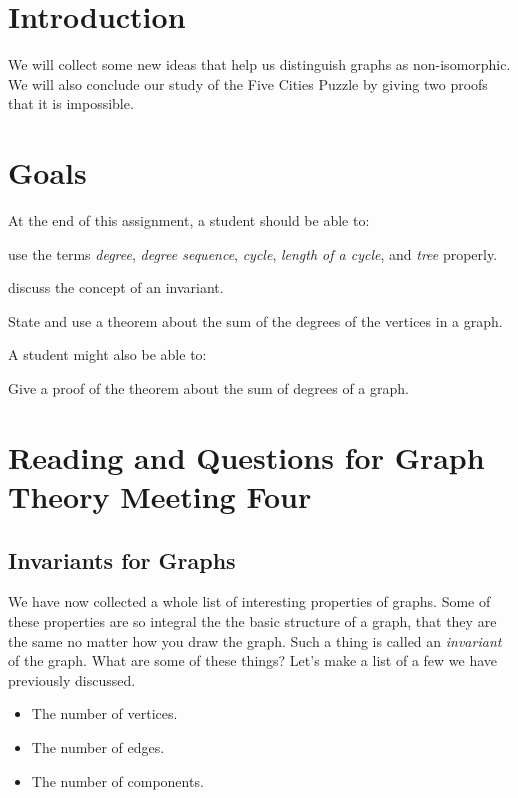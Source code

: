 \documentclass[12pt,letterpaper]{article}
\theoremstyle{definition}
\begin{document}
\setlength{\parskip}{1ex plus 0.5ex minus 0.2ex}
\setlength{\parindent}{0pt}

\pagestyle{fancy}
\cfoot{}

\section*{Introduction}

We will collect some new ideas that help us distinguish graphs as non-isomorphic. We will also conclude our
study of the Five Cities Puzzle by giving two proofs that it is impossible.

\section*{Goals}
At the end of this assignment, a student should be able to:
\begin{compactitem}
\item use the terms \emph{degree}, \emph{degree sequence}, \emph{cycle}, \emph{length of a cycle}, and \emph{tree} properly.
\item discuss the concept of an invariant.
\item State and use a theorem about the sum of the degrees of the vertices in a graph.
\end{compactitem}
A student might also be able to:
\begin{compactitem}
\item Give a proof of the theorem about the sum of degrees of a graph.
\end{compactitem}

\section*{Reading and Questions for Graph Theory Meeting Four}

\subsection*{Invariants for Graphs}

We have now collected a whole list of interesting properties of graphs. Some of these properties are so integral
the the basic structure of a graph, that they are the same no matter how you draw the graph. Such a thing is
called an \emph{invariant} of the graph. What are some of these things? Let's make a list of a few we have previously discussed.
\begin{itemize}
\item The number of vertices.
\item The number of edges.
\item The number of components.
\end{itemize}
\end{document}
